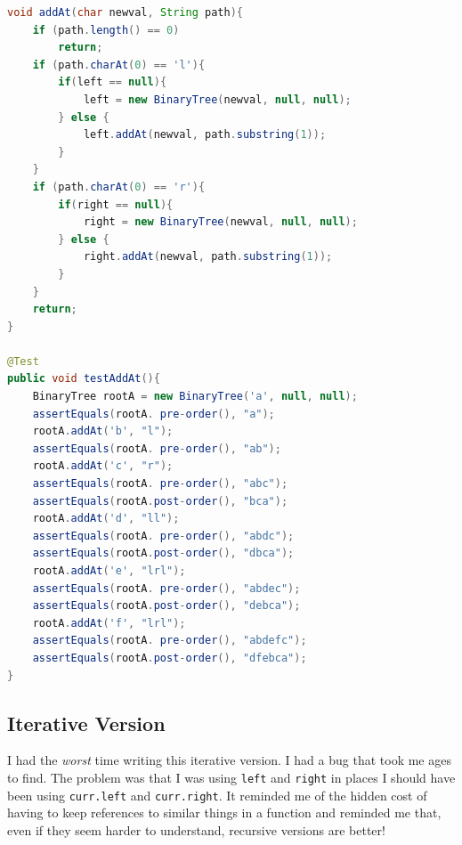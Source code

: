\documentclass[twoside=false,DIV=14]{scrartcl}
\begin{document}
\begin{lstlisting}[language=java]
void addAt(char newval, String path){
    if (path.length() == 0)
        return;
    if (path.charAt(0) == 'l'){
        if(left == null){
            left = new BinaryTree(newval, null, null);
        } else {
            left.addAt(newval, path.substring(1));
        }
    }
    if (path.charAt(0) == 'r'){
        if(right == null){
            right = new BinaryTree(newval, null, null);
        } else {
            right.addAt(newval, path.substring(1));
        }
    }
    return;
}

@Test
public void testAddAt(){
    BinaryTree rootA = new BinaryTree('a', null, null);
    assertEquals(rootA. pre-order(), "a");
    rootA.addAt('b', "l");
    assertEquals(rootA. pre-order(), "ab");
    rootA.addAt('c', "r");
    assertEquals(rootA. pre-order(), "abc");
    assertEquals(rootA.post-order(), "bca");
    rootA.addAt('d', "ll");
    assertEquals(rootA. pre-order(), "abdc");
    assertEquals(rootA.post-order(), "dbca");
    rootA.addAt('e', "lrl");
    assertEquals(rootA. pre-order(), "abdec");
    assertEquals(rootA.post-order(), "debca");
    rootA.addAt('f', "lrl");
    assertEquals(rootA. pre-order(), "abdefc");
    assertEquals(rootA.post-order(), "dfebca");
}

\end{lstlisting}

\subsection{Iterative Version}
I had the \emph{worst} time writing this iterative version. I had a bug that took me ages to find.  The problem was that I was using \verb+left+ and \verb+right+ in places I should have been using \verb+curr.left+ and \verb+curr.right+. It reminded me of the hidden cost of having to keep references to similar things in a function and reminded me that, even if they seem harder to understand, recursive versions are better!
\end{document}
